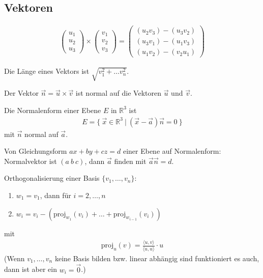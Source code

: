 \documentclass{article}
\begin{document}
\begin{multicols}{2}

\section*{Vektoren}

\begin{align*}
    \begin{pmatrix*}
        u_1 \\
        u_2 \\
        u_3
    \end{pmatrix*} \times \begin{pmatrix*}
        v_1 \\
        v_2 \\
        v_3
    \end{pmatrix*} = \begin{pmatrix*}
        (u_2v_3) - (u_3v_2) \\
        (u_3v_1) - (u_1v_3) \\
        (u_1v_2) - (v_2u_1) 
    \end{pmatrix*}
\end{align*}

Die Länge eines Vektors ist $\sqrt{v_1^2 + \ldots v_n^2}$.

Der Vektor $\vec{n} = \vec{u} \times \vec{v}$ ist normal auf die Vektoren $\vec{u}$ und $\vec{v}$.

Die Normalenform einer Ebene $E$ in $\mathbb{R}^3$ ist
\begin{align*}
    E = \{\ \vec{x} \in \mathbb{R}^3\ |\ (\vec{x} - \vec{a})\vec{n} = 0\ \}
\end{align*}
mit $\vec{n}$ normal auf $\vec{a}$.

Von Gleichungsform $ax + by + cz = d$ einer Ebene auf Normalenform: Normalvektor ist $(a\ b\ c)$, dann $\vec{a}$ finden mit $\vec{a}\vec{n} = d$.

Orthogonalisierung einer Basis $\{v_1, \ldots, v_n\}$:
\begin{enumerate}[label={\arabic*)}]
    \item $w_1 = v_1$, dann für $i = 2, \ldots, n$ 
    \item $w_i = v_i - (\text{proj}_{w_1}(v_i) + \ldots + \text{proj}_{w_{i - 1}}(v_i))$
\end{enumerate}
mit
\begin{align*}
    \text{proj}_u(v) = \frac{\langle u, v\rangle}{\langle u, u\rangle} \cdot u
\end{align*}
(Wenn $v_1, \ldots, v_n$ keine Basis bilden bzw. linear abhängig sind funktioniert es auch, dann ist aber ein $w_i = \vec{0}$.)


\end{multicols}
\end{document}
